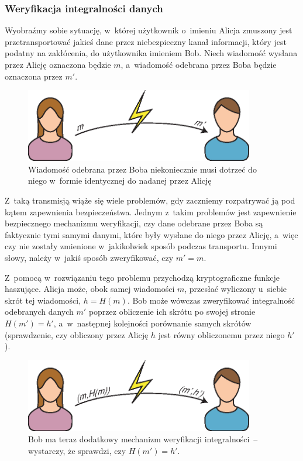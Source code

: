 \subsubsection{Weryfikacja integralności danych}
\label{sec:usage_integrity_check}%
Wyobraźmy sobie sytuację, w~której użytkownik o~imieniu Alicja zmuszony jest
przetransportować jakieś dane przez niebezpieczny kanał informacji, który jest
podatny na zakłócenia, do użytkownika imieniem Bob. Niech wiadomość wysłana
przez Alicję oznaczona będzie $m$, a~wiadomość odebrana przez Boba będzie
oznaczona przez $m'$.

\begin{figure}[htb!]
    \includegraphics[width=10cm]{img/usage1.eps}
    \caption{Wiadomość odebrana przez Boba niekoniecznie musi dotrzeć do niego
    w~formie identycznej do nadanej przez Alicję}
    \label{fig:usage_integrity_check_1}
\end{figure}

Z~taką transmisją wiąże się wiele problemów, gdy zaczniemy rozpatrywać ją pod
kątem zapewnienia bezpieczeństwa. Jednym z~takim problemów jest zapewnienie
bezpiecznego mechanizmu weryfikacji, czy dane odebrane przez Boba są faktycznie
tymi samymi danymi, które były wysłane do niego przez Alicję, a~więc czy nie
zostały zmienione w~jakikolwiek sposób podczas transportu. Innymi słowy, należy
w~jakiś sposób zweryfikować, czy $m' = m$.

Z~pomocą w~rozwiązaniu tego problemu przychodzą kryptograficzne funkcje
haszujące. Alicja może, obok samej wiadomości $m$, przesłać wyliczony u~siebie
skrót tej wiadomości, $h=H(m)$. Bob może wówczas zweryfikować integralność
odebranych danych $m'$ poprzez obliczenie ich skrótu po swojej stronie
$H(m')=h'$, a~w~następnej kolejności porównanie samych skrótów (sprawdzenie,
czy obliczony przez Alicję $h$ jest równy obliczonemu przez niego $h'$).

\begin{figure}[htb!]
    \includegraphics[width=10cm]{img/usage1b.eps}
    \caption{Bob ma teraz dodatkowy mechanizm weryfikacji integralności~--
    wystarczy, że sprawdzi, czy $H(m')=h'$.}
    \label{fig:usage_integrity_check_2}
\end{figure}

